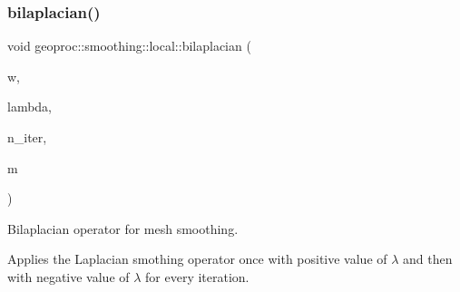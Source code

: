 \subsubsection{\texorpdfstring{bilaplacian()}{bilaplacian()}\hspace{0.1cm}{\footnotesize\ttfamily [1/2]}}
{\footnotesize\ttfamily void geoproc\+::smoothing\+::local\+::bilaplacian (\begin{DoxyParamCaption}\item[{const \hyperlink{namespacegeoproc_a12e5a10581b53b9dd9a509127527f843}{weight} \&}]{w,  }\item[{float}]{lambda,  }\item[{size\+\_\+t}]{n\+\_\+iter,  }\item[{\hyperlink{classgeoproc_1_1TriangleMesh}{Triangle\+Mesh} \&}]{m }\end{DoxyParamCaption})}



Bilaplacian operator for mesh smoothing. 

Applies the Laplacian smothing operator once with positive value of $\lambda$ and then with negative value of $\lambda$ for every iteration.

